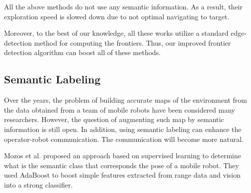 \documentclass[a4paper,10pt]{article}
\newtheorem{definition}{Definition}
\begin{document}
All the above methods do not use any semantic information. As a result, their
exploration speed is slowed down due to not optimal navigating to target.

Moreover, to the best of our knowledge, all these works utilize a standard
edge-detection method for computing the frontiers. Thus, our improved
frontier detection algorithm can boost all of these methods.

% 
% 

\subsection{Semantic Labeling}
Over the years, the problem of building accurate maps of the environment from
the data obtained from a team of mobile robots have been considered many
researchers. However, the question of augmenting such map by semantic information
is still open. In addition, using semantic labeling can enhance the
operator-robot communication. The communication will become more natural.

Mozos et al. \cite{mozos_semantic_2006, stachniss_speeding-up_2006} proposed an
approach based on supervised learning to determine what is the semantic
class that corresponds the pose of a mobile robot. They used AdaBoost to boost
simple features extracted from range data and vision into a strong classifier.
\end{document}
